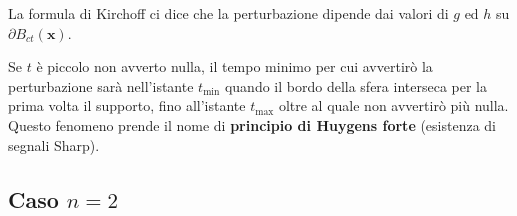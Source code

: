 \documentclass[10pt,a4paper,twoside,openright]{book}
\newcommand{\x}{\mathbf{x}}
\begin{document}
\begin{oss}
\begin{figure}[H]
	\end{figure}
	\FloatBarrier

	La formula di Kirchoff ci dice che la perturbazione dipende dai valori di $g$ ed $h$ su $\displaystyle \partial B_{ct}(\x)$.

	Se $t$ è piccolo non avverto nulla, il tempo minimo per cui avvertirò la perturbazione sarà nell'istante $\displaystyle t_{\min}$ quando il bordo della sfera interseca per la prima volta il supporto, fino all'istante $\displaystyle t_{\max}$ oltre al quale non avvertirò più nulla. Questo fenomeno prende il nome di \textbf{principio di Huygens forte }(esistenza di segnali Sharp).
\end{oss}

\subsection{Caso \texorpdfstring{$n=2$}{n=2}}
\end{document}
